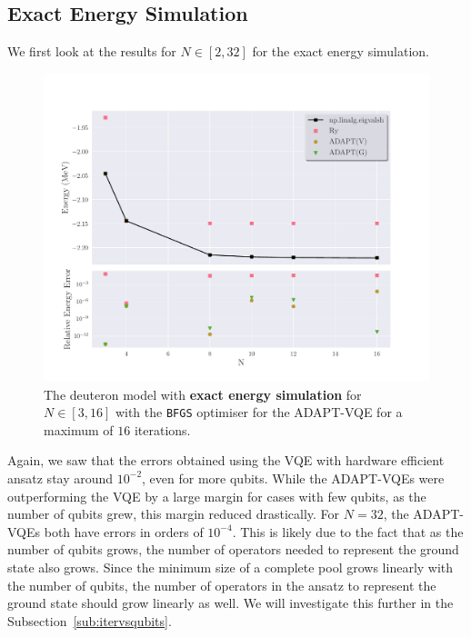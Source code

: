 \subsection{Exact Energy Simulation}
We first look at the results for $ N \in [2,32] $ for the exact energy simulation. 

\begin{figure}[ht]
    \centering
    \includegraphics[width=\linewidth]{image/deuteron_result/main1.pdf}
    \caption{The deuteron model with \textbf{exact energy simulation} for $ N \in [3,16] $ with the \texttt{BFGS} optimiser for the ADAPT-VQE for a maximum of $ 16 $ iterations.}
    \label{fig:deuteronmain}
\end{figure}
Again, we saw that the errors obtained using the VQE with hardware efficient ansatz stay around $ 10^{-2} $, even for more qubits. While the ADAPT-VQEs were outperforming the VQE by a large margin for cases with few qubits, as the number of qubits grew, this margin reduced drastically. For $ N=32 $, the ADAPT-VQEs both have errors in orders of $ 10^{-4} $. This is likely due to the fact that as the number of qubits grows, the number of operators needed to represent the ground state also grows. Since the minimum size of a complete pool grows linearly with the number of qubits, the number of operators in the ansatz to represent the ground state should grow linearly as well. We will investigate this further in the Subsection~\ref{sub:itervsqubits}. 


